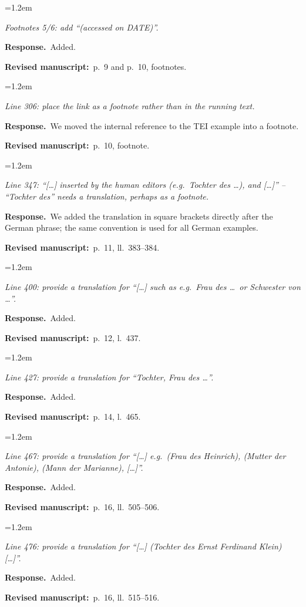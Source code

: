 \documentclass[11pt,a4paper]{article}
\newenvironment{reviewercomment}
  {\par\smallskip\begin{list}{}{\leftmargin=1.2em\rightmargin=0pt}\item[]\color{black!75}\itshape}
  {\end{list}\smallskip}
\newcommand{\response}{\par\noindent\textbf{Response.}~}
\newcommand{\where}[1]{\par\noindent\textbf{Revised manuscript:}~#1\par\medskip}
\begin{document}
\begin{enumerate}[label=\textbf{I\arabic*}, leftmargin=2.2em, itemsep=0.8em]
\item
\begin{reviewercomment}
Footnotes 5/6: add ``(accessed on DATE)''.
\end{reviewercomment}
\response Added.
\where{p.~9 and p.~10, footnotes.}

\item
\begin{reviewercomment}
Line 306: place the link as a footnote rather than in the running text.
\end{reviewercomment}
\response We moved the internal reference to the TEI example into a footnote.
\where{p.~10, footnote.}

\item
\begin{reviewercomment}
Line 347: ``[\dots] inserted by the human editors (e.g.\ Tochter des \dots), and [\dots]'' --
``Tochter des'' needs a translation, perhaps as a footnote.
\end{reviewercomment}
\response We added the translation in square brackets directly after the German phrase; the same
convention is used for all German examples.
\where{p.~11, ll.~383--384.}

\item
\begin{reviewercomment}
Line 400: provide a translation for ``[\dots] such as e.g.\ Frau des \dots\ or Schwester von \dots''.
\end{reviewercomment}
\response Added.
\where{p.~12, l.~437.}

\item
\begin{reviewercomment}
Line 427: provide a translation for ``Tochter, Frau des \dots''.
\end{reviewercomment}
\response Added.
\where{p.~14, l.~465.}

\item
\begin{reviewercomment}
Line 467: provide a translation for ``[\dots] e.g.\ (Frau des Heinrich), (Mutter der Antonie), (Mann
der Marianne), [\dots]''.
\end{reviewercomment}
\response Added.
\where{p.~16, ll.~505--506.}

\item
\begin{reviewercomment}
Line 476: provide a translation for ``[\dots] (Tochter des Ernst Ferdinand Klein) [\dots]''.
\end{reviewercomment}
\response Added.
\where{p.~16, ll.~515--516.}


\end{enumerate}
\end{document}
